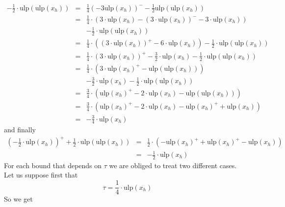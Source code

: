 \documentclass[a4paper,10pt,twoside]{article}
\newenvironment{proof}[1][Proof]{\begin{trivlist}
\item[\hskip \labelsep {\bfseries #1}]}{\end{trivlist}}
\newcommand{\hi}{\ensuremath{\mathit{h}}}
\newcommand{\mUlp}{\ensuremath{\mathrm{ulp}}}
\begin{document}
\begin{proof}
\begin{eqnarray*}
- \frac{1}{2} \cdot \mUlp \left( \mUlp\left( x_\hi \right) \right) 
& = & \frac{1}{4} \left( - 3 \mUlp\left( x_\hi \right) \right)^- - 
\frac{1}{2} \mUlp\left( \mUlp\left( x_\hi \right) \right) \\
& = & \frac{1}{4} \cdot \left( 3 \cdot \mUlp\left( x_\hi \right) - \left( 3 \cdot \mUlp\left( x_\hi \right) \right)^- 
- 3 \cdot \mUlp\left( x_\hi \right) \right) \\
& & - \frac{1}{2} \cdot \mUlp \left( \mUlp \left( x_\hi \right) \right) \\
& = & \frac{1}{4} \cdot \left( \left( 3 \cdot \mUlp\left( x_\hi \right) \right)^+ - 
6 \cdot \mUlp\left( x_\hi \right) \right) - \frac{1}{2} \cdot \mUlp \left( \mUlp \left( x_\hi \right) \right) \\
& = & \frac{1}{4} \cdot \left( 3 \cdot \mUlp\left( x_\hi \right) \right)^+ - \frac{3}{2} \cdot \mUlp\left( x_\hi \right) 
- \frac{1}{2} \cdot \mUlp \left( \mUlp \left( x_\hi \right) \right) \\
& = & \frac{1}{4} \cdot \left( 3 \cdot \mUlp\left( x_\hi \right)^+ - \mUlp\left(\mUlp\left(x_\hi\right)\right) \right)\\
& & - \frac{3}{2} \cdot \mUlp\left( x_\hi \right) - \frac{1}{2} \cdot \mUlp \left( \mUlp\left( x_\hi \right) \right) \\
& = & \frac{3}{4} \cdot \left( \mUlp\left( x_\hi \right)^+ - 2 \cdot \mUlp\left( x_\hi \right) - 
\mUlp\left( \mUlp \left( x_\hi \right) \right) \right) \\
& = & \frac{3}{4} \cdot \left( \mUlp\left( x_\hi \right)^+ - 2 \cdot \mUlp\left( x_\hi \right) - 
\mUlp\left( x_\hi\right)^+ + \mUlp\left( x_\hi \right) \right) \\
& = & - \frac{3}{4} \cdot \mUlp\left( x_\hi \right) 
\end{eqnarray*}
and finally
\begin{eqnarray*}
\left( - \frac{1}{2} \cdot  \mUlp\left( x_\hi \right)  \right)^+ + \frac{1}{2} \cdot \mUlp\left(  \mUlp\left( x_\hi \right)  \right) 
& = & \frac{1}{2} \cdot \left( - \mUlp\left( x_\hi \right)^+ +  \mUlp\left( x_\hi \right)^+ -  \mUlp\left( x_\hi \right)  \right) \\
& = & - \frac{1}{2} \cdot  \mUlp\left( x_\hi \right) 
\end{eqnarray*}
For each bound that depends on $\tau$ we are obliged to treat two different cases.\\
Let us suppose first that
$$\tau = \frac{1}{4} \cdot \mUlp \left( x_\hi \right) $$
So we get
\begin{eqnarray*}

\end{eqnarray*}
\end{proof}
\end{document}

